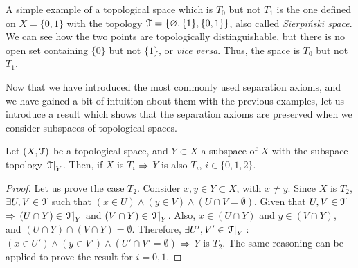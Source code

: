 \begin{example}
	A simple example of a topological space which is $T_0$ but not $T_1$ is the one defined on $X=\{0,1\}$ with the topology $\EuScript{T}=\{\varnothing,\{1\},\{0,1\}\}$, also called \emph{Sierpi\'{n}ski space}. We can see how the two points are topologically distinguishable, but there is no open set containing $\{0\}$ but not $\{1\}$, or \emph{vice versa}. Thus, the space is $T_0$ but not $T_1$.
\end{example}

Now that we have introduced the most commonly used separation axioms, and we have gained a bit of intuition about them with the previous examples, let us introduce a result which shows that the separation axioms are preserved when we consider subspaces of topological spaces.

\begin{theorem}
	\label{th:subspace-separation-consistency}
	Let $(X, \EuScript{T})$ be a topological space, and $Y\subset X$ a subspace of $X$ with the subspace topology $\left.\EuScript{T}\right|_{Y}$.
	Then, if $X$ is $T_i$ $\Rightarrow$ $Y$ is also $T_i$, $i\in\{0,1,2\}$.
\end{theorem}
\begin{proof}
	Let us prove the case $T_2$.
	Consider $x,y\in Y\subset X$, with $x\neq y$.
	Since $X$ is $T_2$, $\exists U,V\in\EuScript{T}$ such that $(x\in U)\land (y\in V)\land (U\cap V=\emptyset)$.
	Given that $U,V\in\EuScript{T}$ $\Rightarrow$ $(U\cap Y)\in \left.\EuScript{T}\right|_{Y}$ and $(V\cap Y)\in \left.\EuScript{T}\right|_{Y}$.
	Also, $x\in (U\cap Y)$ and $y\in (V\cap Y)$, and $(U\cap Y)\cap (V\cap Y)=\emptyset$.
	Therefore, $\exists U', V'\in \left.\EuScript{T}\right|_{Y}$\,:\,$(x\in U')\land (y\in V')\land (U'\cap V'=\emptyset)$ $\Rightarrow$ $Y$ is $T_2$.
	The same reasoning can be applied to prove the result for $i=0,1$.
\end{proof}

